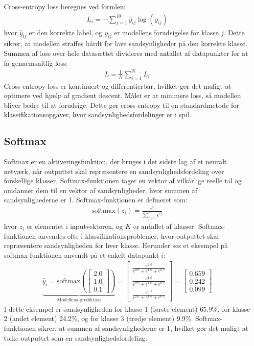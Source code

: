 \documentclass{article}
\begin{document}
Cross-entropy loss beregnes ved formlen:
\begin{align}
L_i = -\sum_{j=1}^{10} \hat{y}_{ij} \log(y_{ij})
\end{align}
hvor $ \hat{y}_{ij} $ er den korrekte label, og $ y_{ij} $ er modellens forudsigelse for klasse $ j $. Dette sikrer, at modellen straffes hårdt for lave sandsynligheder på den korrekte klasse. Summen af loss over hele datasættet divideres med antallet af datapunkter for at få gennemsnitlig loss:
\begin{align}
L = \frac{1}{N} \sum_{i=1}^{N} L_i
\end{align}
Cross-entropy loss er kontinuert og differentierbar, hvilket gør det muligt at optimere ved hjælp af gradient descent. Målet er at minimere loss, så modellen bliver bedre til at forudsige. Dette gør cross-entropy til en standardmetode for klassifikationsopgaver, hvor sandsynlighedsfordelinger er i spil.

\subsection{Softmax}
Softmax er en aktiveringsfunktion, der bruges i det sidste lag af et neuralt netværk, når outputtet skal repræsentere en sandsynlighedsfordeling over forskellige klasser. Softmax-funktionen tager en vektor af vilkårlige reelle tal og omdanner dem til en vektor af sandsynligheder, hvor summen af sandsynlighederne er 1. Softmax-funktionen er defineret som:
\begin{align}
  \text{softmax}(z_i) = \frac{e^{z_i}}{\sum_{j=1}^{K} e^{z_j}}
\end{align}
hvor $z_i$ er elementet i inputvektoren, og $K$ er antallet af klasser. Softmax-funktionen anvendes ofte i klassifikationsproblemer, hvor outputtet skal repræsentere sandsynligheden for hver klasse. Herunder ses et eksempel på softmax-funktionen anvendt på et enkelt datapunkt $i$:
\begin{align}
  \underbrace{\hat{y}_i = \text{softmax}\left(\begin{bmatrix}
    2.0 \\
    1.0 \\
    0.1
  \end{bmatrix}\right)}_{\text{Modellens prediktion}}
  = \begin{bmatrix}
    \frac{e^{2.0}}{e^{2.0} + e^{1.0} + e^{0.1}} \\
    \frac{e^{1.0}}{e^{2.0} + e^{1.0} + e^{0.1}} \\
    \frac{e^{0.1}}{e^{2.0} + e^{1.0} + e^{0.1}}
  \end{bmatrix}
  = \begin{bmatrix}
    0.659 \\
    0.242 \\
    0.099
  \end{bmatrix}
\end{align}
I dette eksempel er sandsynligheden for klasse 1 (første element) 65.9\%, for klasse 2 (andet element) 24.2\%, og for klasse 3 (tredje element) 9.9\%. Softmax-funktionen sikrer, at summen af sandsynlighederne er 1, hvilket gør det muligt at tolke outputtet som en sandsynlighedsfordeling. \parencite{Sanderson_2017}
\end{document}
